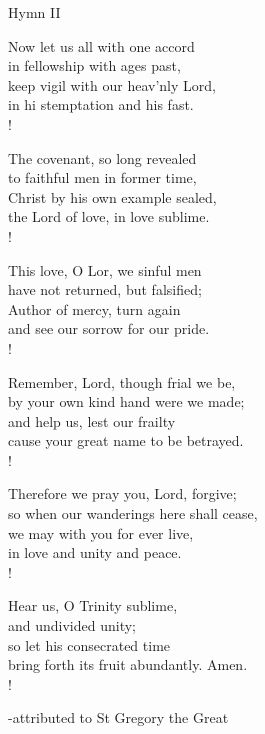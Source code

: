 Hymn II
\begin{cverse}
Now let us all with one accord\\
in fellowship with ages past,\\
keep vigil with our heav'nly Lord,\\
in hi stemptation and his fast.\\!

The covenant, so long revealed \\
to faithful men in former time,\\
Christ by his own example sealed,\\
the Lord of love, in love sublime.\\!

This love, O Lor, we sinful men\\
have not returned, but falsified;\\
Author of mercy, turn again\\
and see our sorrow for our pride.\\!

Remember, Lord, though frial we be,\\
by your own kind hand were we made;\\
and help us, lest our frailty\\
cause your great name to be betrayed.\\!

Therefore we pray you, Lord, forgive;\\
so when our wanderings here shall cease,\\
we may with you for ever live,\\
in love and unity and peace.\\!

Hear us, O Trinity sublime,\\
and undivided unity;\\
so let his consecrated time\\
bring forth its fruit abundantly. Amen.\\!
\end{cverse}
\begin{flushright}\tiny -attributed to St Gregory the Great\end{flushright}

